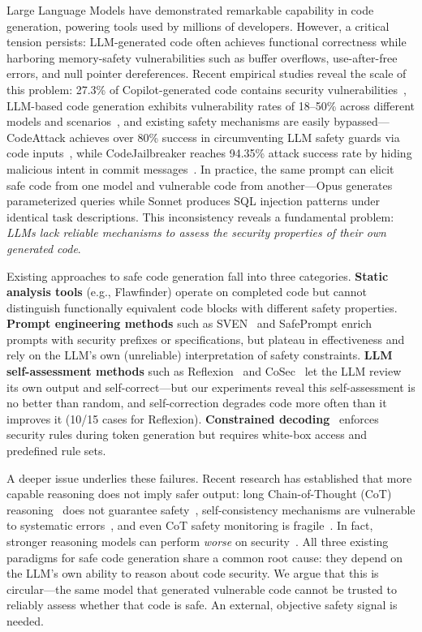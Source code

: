 \documentclass[sigconf,10pt]{acmart}
\begin{document}
Large Language Models have demonstrated remarkable capability in code generation, powering tools used by millions of developers. However, a critical tension persists: LLM-generated code often achieves functional correctness while harboring memory-safety vulnerabilities such as buffer overflows, use-after-free errors, and null pointer dereferences. Recent empirical studies reveal the scale of this problem: 27.3\% of Copilot-generated code contains security vulnerabilities~\cite{copilotsec}, LLM-based code generation exhibits vulnerability rates of 18--50\% across different models and scenarios~\cite{chromesecbench}, and existing safety mechanisms are easily bypassed---CodeAttack achieves over 80\% success in circumventing LLM safety guards via code inputs~\cite{codeattack}, while CodeJailbreaker reaches 94.35\% attack success rate by hiding malicious intent in commit messages~\cite{codejailbreaker}. In practice, the same prompt can elicit safe code from one model and vulnerable code from another---Opus generates parameterized queries while Sonnet produces SQL injection patterns under identical task descriptions. This inconsistency reveals a fundamental problem: \textit{LLMs lack reliable mechanisms to assess the security properties of their own generated code}.

Existing approaches to safe code generation fall into three categories. \textbf{Static analysis tools} (e.g., Flawfinder) operate on completed code but cannot distinguish functionally equivalent code blocks with different safety properties. \textbf{Prompt engineering methods} such as SVEN~\cite{sven} and SafePrompt enrich prompts with security prefixes or specifications, but plateau in effectiveness and rely on the LLM's own (unreliable) interpretation of safety constraints. \textbf{LLM self-assessment methods} such as Reflexion~\cite{reflexion} and CoSec~\cite{cosec} let the LLM review its own output and self-correct---but our experiments reveal this self-assessment is no better than random, and self-correction degrades code more often than it improves it (10/15 cases for Reflexion). \textbf{Constrained decoding}~\cite{constraineddecode} enforces security rules during token generation but requires white-box access and predefined rule sets.

A deeper issue underlies these failures. Recent research has established that more capable reasoning does not imply safer output: long Chain-of-Thought (CoT) reasoning~\cite{cot} does not guarantee safety~\cite{safechain}, self-consistency mechanisms are vulnerable to systematic errors~\cite{tooconsistent}, and even CoT safety monitoring is fragile~\cite{cotmonitor}. In fact, stronger reasoning models can perform \textit{worse} on security~\cite{chromesecbench,lrmsafety}. All three existing paradigms for safe code generation share a common root cause: they depend on the LLM's own ability to reason about code security. We argue that this is circular---the same model that generated vulnerable code cannot be trusted to reliably assess whether that code is safe. An external, objective safety signal is needed.
\end{document}
